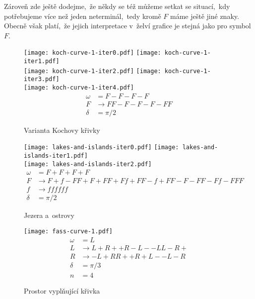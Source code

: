 Zároveň zde ještě dodejme,~že někdy se též můžeme setkat se situací,~kdy potřebujeme více než jeden neterminál,~tedy kromě $F$ máme ještě jiné znaky. Obecně však platí,~že jejich interpretace v~želví grafice je stejná jako pro symbol $F$.
\begin{figure}[p]
    \centering
    \texttt{[image: koch-curve-1-iter0.pdf]}\qquad
    \texttt{[image: koch-curve-1-iter1.pdf]}\qquad\\
    \texttt{[image: koch-curve-1-iter2.pdf]}\qquad
    \texttt{[image: koch-curve-1-iter3.pdf]}\qquad\\
    \texttt{[image: koch-curve-1-iter4.pdf]}\qquad
    \begin{align*}
        \omega&=F-F-F-F\\
        F&\to FF-F-F-F-FF\\
        \delta&=\pi/2
    \end{align*}
    \caption{Varianta Kochovy křivky}
    \label{fig:lsystem-varianta-kochovy-krivky}
\end{figure}
\begin{figure}[p]
    \centering
    \texttt{[image: lakes-and-islands-iter0.pdf]}\qquad
    \texttt{[image: lakes-and-islands-iter1.pdf]}\qquad\\
    \texttt{[image: lakes-and-islands-iter2.pdf]}
    \begin{align*}
        \omega&=F+F+F+F\\
        F&\to F+f-FF+F+FF+Ff+FF-f+FF-F-FF-Ff-FFF\\
        f&\to ffffff\\
        \delta&=\pi/2
    \end{align*}
    \caption{Jezera a~ostrovy}
    \label{fig:lsystem-jezera-a-ostrovy}
\end{figure}
\begin{figure}[H]
    \centering
    \texttt{[image: fass-curve-1.pdf]}
    \begin{align*}
        \omega&=L\\
        L&\to L+R++R-L--LL-R+\\
        R&\to -L+RR++R+L--L-R\\
        \delta&=\pi/3\\
        n&=4
    \end{align*}
    \caption{Prostor vyplňující křivka}
    \label{fig:prostor-vyplnujici-krivka}
\end{figure}
